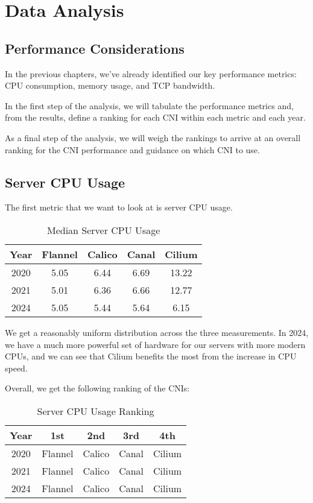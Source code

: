 %
%

\pagebreak
\section{Data Analysis}

\onehalfspacing

\subsection{Performance Considerations}

In the previous chapters, we've already identified our key performance metrics: CPU consumption, memory usage, and TCP bandwidth. 

In the first step of the analysis, we will tabulate the performance metrics and, from the results, define a ranking for each CNI within each metric and each year.

As a final step of the analysis, we will weigh the rankings to arrive at an overall ranking for the CNI performance and guidance on which CNI to use.

\subsection{Server CPU Usage}

The first metric that we want to look at is server CPU usage.

\begin{table}[H]
\caption{Median Server CPU Usage}
\begin{tabular}{|c | c | c | c | c|} 
 \hline
 Year & Flannel & Calico & Canal & Cilium \\
 \hline\hline
 2020 & 5.05 & 6.44 & 6.69 & 13.22 \\ 
 \hline
 2021 & 5.01 & 6.36 & 6.66 & 12.77 \\
 \hline
 2024 & 5.05 & 5.44 & 5.64 & 6.15 \\
 \hline
\end{tabular}
\label{tab:cpu}
\end{table}

We get a reasonably uniform distribution across the three measurements. In 2024, we have a much more powerful set of hardware for our servers with more modern CPUs, and we can see that Cilium benefits the most from the increase in CPU speed.

Overall, we get the following ranking of the CNIs:

\begin{table}[H]
\caption{Server CPU Usage Ranking}
\begin{tabular}{|c | c | c | c | c|} 
 \hline
 Year & 1st & 2nd & 3rd & 4th \\
 \hline\hline
 2020 & Flannel & Calico & Canal & Cilium \\ 
 \hline
 2021 & Flannel & Calico & Canal & Cilium \\
 \hline
 2024 & Flannel & Calico & Canal & Cilium \\
 \hline
\end{tabular}
\label{tab:cpu-r}
\end{table}

